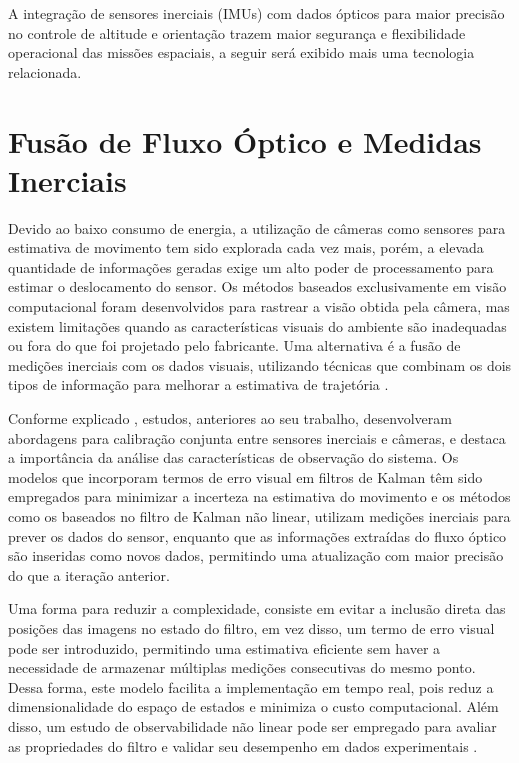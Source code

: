 A integração de sensores inerciais (IMUs) com dados ópticos para maior precisão no controle de altitude e orientação trazem maior segurança e flexibilidade operacional das missões espaciais, a seguir será exibido mais uma tecnologia relacionada.

\section{Fusão de Fluxo Óptico e Medidas Inerciais}

Devido ao baixo consumo de energia, a utilização de câmeras como sensores para estimativa de movimento tem sido explorada cada vez mais, porém, a elevada quantidade de informações geradas exige um alto poder de processamento para estimar o deslocamento do sensor. Os métodos baseados exclusivamente em visão computacional foram desenvolvidos para rastrear a visão obtida pela câmera, mas existem limitações quando as características visuais do ambiente são inadequadas ou fora do que foi projetado pelo fabricante. Uma alternativa é a fusão de medições inerciais com os dados visuais, utilizando técnicas que combinam os dois tipos de informação para melhorar a estimativa de trajetória \citep{bloesch2014}.

Conforme explicado \citep{bloesch2014}, estudos, anteriores ao seu trabalho, desenvolveram abordagens para calibração conjunta entre sensores inerciais e câmeras, e destaca a importância da análise das características de observação do sistema. Os modelos que incorporam termos de erro visual em filtros de Kalman têm sido empregados para minimizar a incerteza na estimativa do movimento e os métodos como os baseados no filtro de Kalman não linear, utilizam medições inerciais para prever os dados do sensor, enquanto que as informações extraídas do fluxo óptico são inseridas como novos dados, permitindo uma atualização com maior precisão do que a iteração anterior.

Uma forma para reduzir a complexidade, consiste em evitar a inclusão direta das posições das imagens no estado do filtro, em vez disso, um termo de erro visual pode ser introduzido, permitindo uma estimativa eficiente sem haver a necessidade de armazenar múltiplas medições consecutivas do mesmo ponto. Dessa forma, este modelo facilita a implementação em tempo real, pois reduz a dimensionalidade do espaço de estados e minimiza o custo computacional. Além disso, um estudo de observabilidade não linear pode ser empregado para avaliar as propriedades do filtro e validar seu desempenho em dados experimentais \citep{bloesch2014}.
